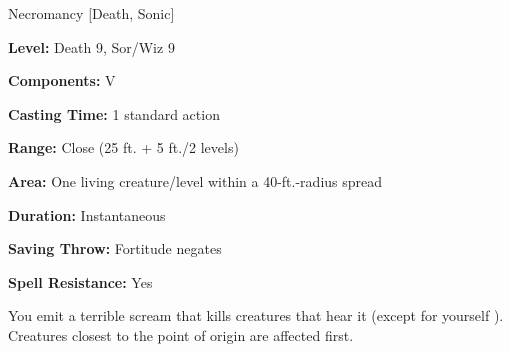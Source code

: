 
Necromancy [Death, Sonic]

\textbf{Level:} Death 9, Sor/Wiz 9

\textbf{Components:} V

\textbf{Casting Time:} 1 standard action

\textbf{Range:} Close (25 ft. + 5 ft./2 levels)

\textbf{Area:} One living creature/level within a 40-ft.-radius spread

\textbf{Duration:} Instantaneous

\textbf{Saving Throw:} Fortitude negates

\textbf{Spell Resistance:} Yes

You emit a terrible scream that kills creatures that hear it (except for yourself 
). Creatures closest to the point of origin are affected first.

